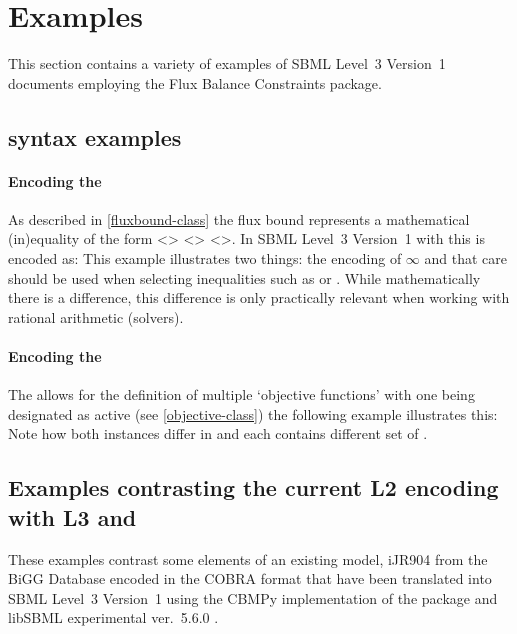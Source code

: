 
\section{Examples}
\label{examples}

This section contains a variety of examples of SBML Level~3 Version~1
documents employing the Flux Balance Constraints package.

\subsection{\FBC syntax examples}

\paragraph{Encoding the \FluxBound}
As described in \ref{fluxbound-class} the flux bound represents a mathematical (in)equality of the form <> <> <>. In SBML Level~3 Version~1 with \FBC this is encoded as:
%
%
This example illustrates two things: the encoding of $\infty$ and that care should be used when selecting inequalities such as \value{less} or \value{greater}. While mathematically there is a difference, this difference is only practically relevant when working with rational arithmetic (solvers).

\paragraph{Encoding the \Objective}
The \FBC allows for the definition of multiple `objective functions' with one being designated as active (see \ref{objective-class}) the following example illustrates this:
%
%
Note how both \Objective instances differ in  and each contains different set of .


\subsection{Examples contrasting the current \SBML L2 encoding with L3 and \FBC}
These examples contrast some elements of an existing model, iJR904 from the \textsf{BiGG} Database encoded in the \textsf{COBRA} format \cite{ijr904, bigg, cobra} that have been translated into SBML Level~3 Version~1 using the \textsf{CBMPy} implementation of the \FBC package \cite{pysces, cbmpy} and \textsf{libSBML} experimental ver.~5.6.0 \cite{libsbml}.


